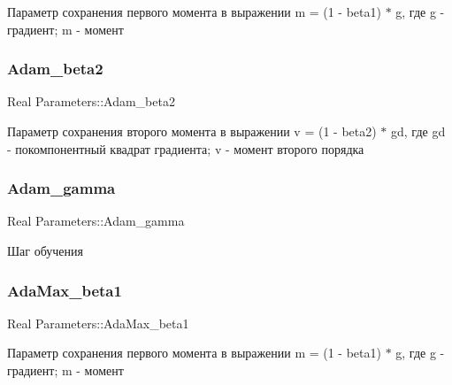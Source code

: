 Параметр сохранения первого момента в выражении m = (1 -\/ beta1) $\ast$ g, где g -\/ градиент; m -\/ момент \mbox{\label{structParameters_a2a80a92cc9f7a7748293b1aee8eb44d9}} 
\subsubsection{\texorpdfstring{Adam\+\_\+beta2}{Adam\_beta2}}
{\footnotesize\ttfamily Real Parameters\+::\+Adam\+\_\+beta2\hspace{0.3cm}{\ttfamily [static]}}

Параметр сохранения второго момента в выражении v = (1 -\/ beta2) $\ast$ gd, где gd -\/ покомпонентный квадрат градиента; v -\/ момент второго порядка \mbox{\label{structParameters_a16a784f47a8334f61e84429b4397f179}} 
\subsubsection{\texorpdfstring{Adam\+\_\+gamma}{Adam\_gamma}}
{\footnotesize\ttfamily Real Parameters\+::\+Adam\+\_\+gamma\hspace{0.3cm}{\ttfamily [static]}}

Шаг обучения \mbox{\label{structParameters_a6933336b29f335b8ac36a4911abda94b}} 
\subsubsection{\texorpdfstring{Ada\+Max\+\_\+beta1}{AdaMax\_beta1}}
{\footnotesize\ttfamily Real Parameters\+::\+Ada\+Max\+\_\+beta1\hspace{0.3cm}{\ttfamily [static]}}

Параметр сохранения первого момента в выражении m = (1 -\/ beta1) $\ast$ g, где g -\/ градиент; m -\/ момент \mbox{\label{structParameters_ae820275a1b04e2241862fa9141d3fd29}} 
